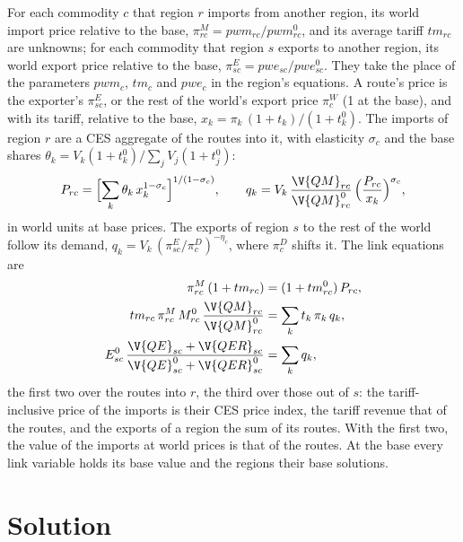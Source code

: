 For each commodity $c$ that region $r$ imports from another region, its world
import price relative to the base, $\pi^M_{rc} = pwm_{rc}/pwm^0_{rc}$, and its
average tariff $tm_{rc}$ are unknowns; for each commodity that region $s$
exports to another region, its world export price relative to the base,
$\pi^E_{sc} = pwe_{sc}/pwe^0_{sc}$. They take the place of the parameters
$pwm_c$, $tm_c$ and $pwe_c$ in the region's equations. A route's price is the
exporter's $\pi^E_{sc}$, or the rest of the world's export price $\pi^W_c$ (1
at the base), and with its tariff, relative to the base,
$x_k = \pi_k\,(1 + t_k)/(1 + t^0_k)$. The imports of region $r$ are a CES
aggregate of the routes into it, with elasticity $\sigma_c$ and the base
shares $\theta_k = V_k(1 + t^0_k)/\sum_j V_j(1 + t^0_j)$:
\begin{gather*}
P_{rc} = \Bigl[\sum_k \theta_k\,x_k^{1-\sigma_c}\Bigr]^{1/(1-\sigma_c)}, \qquad
q_k = V_k\,\frac{\V{QM}_{rc}}{\V{QM}^0_{rc}}\,\Bigl(\frac{P_{rc}}{x_k}\Bigr)^{\sigma_c},
\end{gather*}
in world units at base prices. The exports of region $s$ to the rest of the
world follow its demand, $q_k = V_k\,(\pi^E_{sc}/\pi^D_c)^{-\eta_c}$, where
$\pi^D_c$ shifts it. The link equations are
\begin{align*}
\pi^M_{rc}\,(1 + tm_{rc}) &= (1 + tm^0_{rc})\,P_{rc},\\
tm_{rc}\,\pi^M_{rc}\,M^0_{rc}\,\frac{\V{QM}_{rc}}{\V{QM}^0_{rc}} &= \sum_k t_k\,\pi_k\,q_k,\\
E^0_{sc}\,\frac{\V{QE}_{sc} + \V{QER}_{sc}}{\V{QE}^0_{sc} + \V{QER}^0_{sc}} &= \sum_k q_k,
\end{align*}
the first two over the routes into $r$, the third over those out of $s$: the
tariff-inclusive price of the imports is their CES price index, the tariff
revenue that of the routes, and the exports of a region the sum of its
routes. With the first two, the value of the imports at world prices is that
of the routes. At the base every link variable holds its base value and the
regions their base solutions.

\section{Solution}

